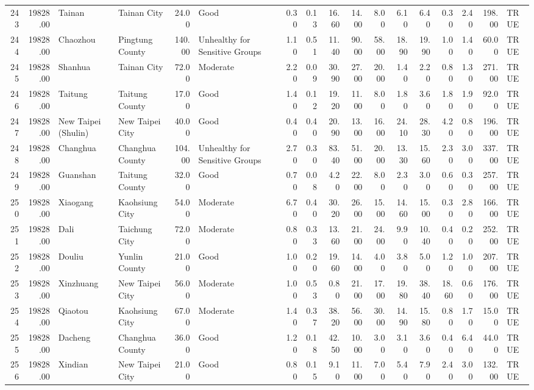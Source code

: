 \begin{table}[ht]
\begin{tabular}{rrllrlrrrrrrrrrrl}
  243 & 19828.00 & Tainan & Tainan City & 24.00 & Good & 0.30 & 0.13 & 16.60 & 14.00 & 8.00 & 6.10 & 6.40 & 0.30 & 2.40 & 198.00 & TRUE \\ 
  244 & 19828.00 & Chaozhou & Pingtung County & 140.00 & Unhealthy for Sensitive Groups & 1.10 & 0.51 & 11.40 & 90.00 & 58.00 & 18.90 & 19.90 & 1.00 & 1.40 & 60.00 & TRUE \\ 
  245 & 19828.00 & Shanhua & Tainan City & 72.00 & Moderate & 2.20 & 0.09 & 30.90 & 27.00 & 20.00 & 1.40 & 2.20 & 0.80 & 1.30 & 271.00 & TRUE \\ 
  246 & 19828.00 & Taitung & Taitung County & 17.00 & Good & 1.40 & 0.12 & 19.20 & 11.00 & 8.00 & 1.80 & 3.60 & 1.80 & 1.90 & 92.00 & TRUE \\ 
  247 & 19828.00 & New Taipei (Shulin) & New Taipei City & 40.00 & Good & 0.40 & 0.40 & 20.90 & 13.00 & 16.00 & 24.10 & 28.30 & 4.20 & 0.80 & 196.00 & TRUE \\ 
  248 & 19828.00 & Changhua & Changhua County & 104.00 & Unhealthy for Sensitive Groups & 2.70 & 0.30 & 83.40 & 51.00 & 20.00 & 13.30 & 15.60 & 2.30 & 3.00 & 337.00 & TRUE \\ 
  249 & 19828.00 & Guanshan & Taitung County & 32.00 & Good & 0.70 & 0.08 & 4.20 & 22.00 & 8.00 & 2.30 & 3.00 & 0.60 & 0.30 & 257.00 & TRUE \\ 
  250 & 19828.00 & Xiaogang & Kaohsiung City & 54.00 & Moderate & 6.70 & 0.40 & 30.20 & 26.00 & 15.00 & 14.60 & 15.00 & 0.30 & 2.80 & 166.00 & TRUE \\ 
  251 & 19828.00 & Dali & Taichung City & 72.00 & Moderate & 0.80 & 0.33 & 13.60 & 21.00 & 24.00 & 9.90 & 10.40 & 0.40 & 0.20 & 252.00 & TRUE \\ 
  252 & 19828.00 & Douliu & Yunlin County & 21.00 & Good & 1.00 & 0.20 & 19.60 & 14.00 & 4.00 & 3.80 & 5.00 & 1.20 & 1.00 & 207.00 & TRUE \\ 
  253 & 19828.00 & Xinzhuang & New Taipei City & 56.00 & Moderate & 1.00 & 0.53 & 0.80 & 21.00 & 17.00 & 19.80 & 38.40 & 18.60 & 0.60 & 176.00 & TRUE \\ 
  254 & 19828.00 & Qiaotou & Kaohsiung City & 67.00 & Moderate & 1.40 & 0.37 & 38.20 & 56.00 & 30.00 & 14.90 & 15.80 & 0.80 & 1.70 & 15.00 & TRUE \\ 
  255 & 19828.00 & Dacheng & Changhua County & 36.00 & Good & 1.20 & 0.18 & 42.50 & 10.00 & 3.00 & 3.10 & 3.60 & 0.40 & 6.40 & 44.00 & TRUE \\ 
  256 & 19828.00 & Xindian & New Taipei City & 21.00 & Good & 0.80 & 0.15 & 9.10 & 11.00 & 7.00 & 5.40 & 7.90 & 2.40 & 3.00 & 132.00 & TRUE \\ 

\end{tabular}
\end{table}
